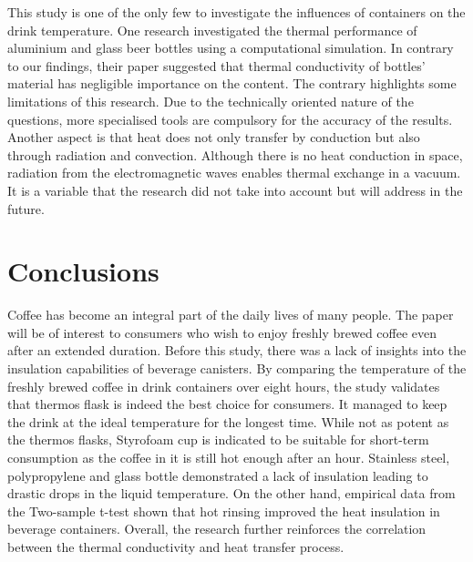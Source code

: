 \documentclass[11pt]{article}
\begin{document}
This study is one of the only few to investigate the influences of containers on the drink temperature. One research \citep{Bailey2008} investigated the thermal performance of aluminium and glass beer bottles using a computational simulation. In contrary to our findings, their paper suggested that thermal conductivity of bottles' material has negligible importance on the content. The contrary highlights some limitations of this research. Due to the technically oriented nature of the questions, more specialised tools are compulsory for the accuracy of the results. Another aspect is that heat does not only transfer by conduction but also through radiation and convection. Although there is no heat conduction in space, radiation from the electromagnetic waves enables thermal exchange in a vacuum. It is a variable that the research did not take into account but will address in the future.

\section*{Conclusions}

Coffee has become an integral part of the daily lives of many people. The paper will be of interest to consumers who wish to enjoy freshly brewed coffee even after an extended duration. Before this study, there was a lack of insights into the insulation capabilities of beverage canisters. By comparing the temperature of the freshly brewed coffee in drink containers over eight hours, the study validates that thermos flask is indeed the best choice for consumers. It managed to keep the drink at the ideal temperature for the longest time. While not as potent as the thermos flasks, Styrofoam cup is indicated to be suitable for short-term consumption as the coffee in it is still hot enough after an hour. Stainless steel, polypropylene and glass bottle demonstrated a lack of insulation leading to drastic drops in the liquid temperature. On the other hand, empirical data from the Two-sample t-test shown that hot rinsing improved the heat insulation in beverage containers. Overall, the research further reinforces the correlation between the thermal conductivity and heat transfer process.
 
	
\end{document}
